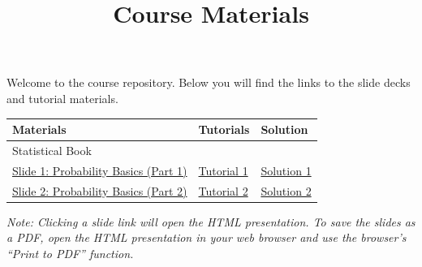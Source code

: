 \documentclass[
  letterpaper,
  DIV=11,
  numbers=noendperiod]{scrartcl}
\title{Course Materials}
\author{}
\date{}
\newcounter{none} %
\begin{document}
\maketitle


Welcome to the course repository. Below you will find the links to the
slide decks and tutorial materials.

{\def\LTcaptype{none} %
\begin{longtable}[]{@{}
  >{\raggedright\arraybackslash}p{}
  >{\raggedright\arraybackslash}p{}
  >{\raggedright\arraybackslash}p{}@{}}
\toprule\noalign{}
\begin{minipage}[b]{\linewidth}\raggedright
Materials
\end{minipage} & \begin{minipage}[b]{\linewidth}\raggedright
Tutorials
\end{minipage} & \begin{minipage}[b]{\linewidth}\raggedright
Solution
\end{minipage} \\
\midrule\noalign{}
\endhead
\bottomrule\noalign{}
\endlastfoot
Statistical Book & & \\
\href{Slide_1.html}{Slide 1: Probability Basics (Part 1)} &
\href{Tutorial_1.html}{Tutorial 1} & \href{Solution_1.html}{Solution
1} \\
\href{Slide_2.html}{Slide 2: Probability Basics (Part 2)} &
\href{Tutorial_2.html}{Tutorial 2} & \href{Solution_2.html}{Solution
2} \\
\end{longtable}
}

\emph{Note: Clicking a slide link will open the HTML presentation. To
save the slides as a PDF, open the HTML presentation in your web browser
and use the browser's ``Print to PDF'' function.}
\end{document}
